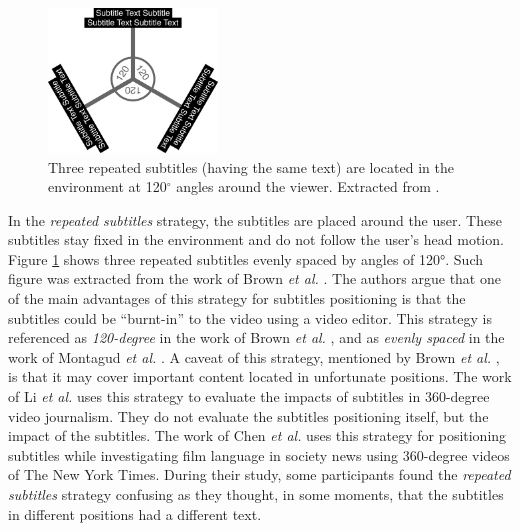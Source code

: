 \begin{figure}[!ht]
    \centering
    \includegraphics[width=0.4\textwidth]{img/video360/120_subtitles.png}
    \caption{Three repeated subtitles (having the same text) are located in the environment at 120$^{\circ}$ angles around the viewer. Extracted from \cite{brown_subtitles_2017}.}
    \label{fig:120_subtitles}
\end{figure}

In the \emph{repeated subtitles} strategy, the subtitles are placed around the user. These subtitles stay fixed in the environment and do not follow the user's head motion. Figure \ref{fig:120_subtitles} shows three repeated subtitles evenly spaced by angles of 120°. Such figure was extracted from the work of Brown \emph{et al.} \cite{brown_subtitles_2017}. The authors argue that one of the main advantages of this strategy for subtitles positioning is that the subtitles could be ``burnt-in'' to the video using a video editor. This strategy is referenced as \emph{120-degree} in the work of Brown \emph{et al.} \cite{brown_subtitles_2017}, and as \emph{evenly spaced} in the work of Montagud \emph{et al.} \cite{montagud_culture_2020}. A caveat of this strategy, mentioned by Brown \emph{et al.} \cite{brown_subtitles_2017}, is that it may cover important content located in unfortunate positions. 
The work of Li \emph{et al.} \cite{li_impacts_2018} uses this strategy to evaluate the impacts of subtitles in 360-degree video journalism. They do not evaluate the subtitles positioning itself, but the impact of the subtitles. The work of Chen \emph{et al.} \cite{chen_film_2017} uses this strategy for positioning subtitles while investigating film language in society news using 360-degree videos of The New York Times. During their study, some participants found the \emph{repeated subtitles} strategy confusing as they thought, in some moments, that the subtitles in different positions had a different text.


